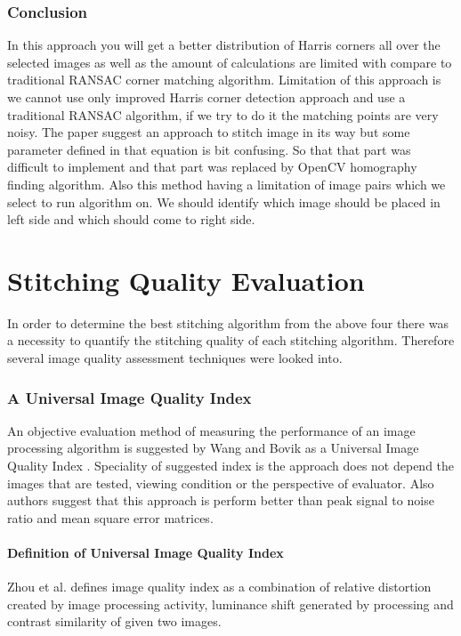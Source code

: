 \subsubsection{Conclusion}
In this approach you will get a better distribution of Harris corners all over the selected images as well as the amount of calculations are limited with compare to traditional RANSAC corner matching algorithm. Limitation of this approach is we cannot use only improved Harris corner detection approach and use a traditional RANSAC algorithm, if we try to do it the matching points are very noisy. The paper suggest an approach to stitch image in its way but some parameter defined in that equation is bit confusing. So that that part was difficult to implement and that part was replaced by OpenCV homography finding algorithm. Also this method having a limitation of image pairs which we select to run algorithm on. We should identify which image should be placed in left side and which should come to right side.


\section{Stitching Quality Evaluation}
In order to determine the best stitching algorithm from the above four there was a necessity to quantify the stitching quality of each stitching algorithm. Therefore several image quality assessment techniques were looked into.

\subsubsection{A Universal Image Quality Index}
An objective evaluation method of measuring the performance of an image processing algorithm is suggested by Wang and Bovik as a Universal Image Quality Index \cite{Bovik2002}. Speciality of suggested index is the approach does not depend the images that are tested, viewing condition or the perspective of evaluator. Also authors suggest that this approach is perform better than peak signal to noise ratio and mean square error matrices.

\paragraph*{\textbf{Definition of Universal Image Quality Index}}
Zhou et al. defines image quality index as a combination of relative distortion created by image processing activity, luminance shift  generated by processing and contrast similarity of given two images. 

